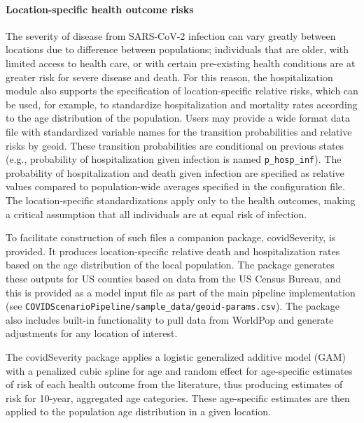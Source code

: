 {\paragraph{Location-specific health outcome risks}
The severity of disease from SARS-CoV-2 infection can vary greatly between locations due to difference between populations; individuals that are older, with limited access to health care, or with certain pre-existing health conditions are at greater risk for severe disease and death. For this reason, the hospitalization module also supports the specification of location-specific relative risks, which can be used, for example, to standardize hospitalization and mortality rates according to the age distribution of the population. Users may provide a wide format data file with standardized variable names for the transition probabilities and relative risks by geoid. These transition probabilities are conditional on previous states (e.g., probability of hospitalization given infection is named \verb|p_hosp_inf|). The probability of hospitalization and death given infection are specified as relative values compared to population-wide averages specified in the configuration file. The location-specific standardizations apply only to the health outcomes, making a critical assumption that all individuals are at equal risk of infection.

To facilitate construction of such files a companion package, covidSeverity, is provided. It produces location-specific relative death and hospitalization rates based on the age distribution of the local population\cite{Lauer:HopkinsIDDCovidSeverityInitial:2020}. The package generates these outputs for US counties based on data from the US Census Bureau, and  this is provided as a model input file as part of the main pipeline implementation (see \verb|COVIDScenarioPipeline/sample_data/geoid-params.csv|). The package also includes built-in functionality to pull data from WorldPop and generate adjustments for any location of interest\cite{Lauer:HopkinsIDDCovidSeverityInitial:2020}.

The covidSeverity package applies a logistic generalized additive model (GAM) with a penalized cubic spline for age and random effect for age-specific estimates of risk of each health outcome from the literature, thus producing estimates of risk for 10-year, aggregated age categories. These age-specific estimates are then applied to the population age distribution in a given location.

}
